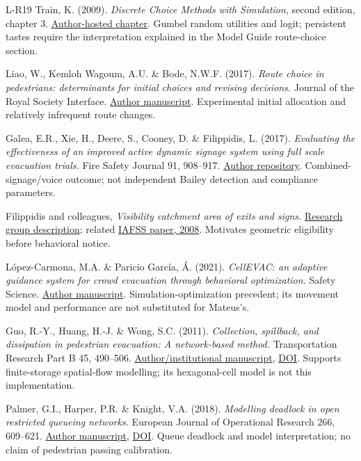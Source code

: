 \documentclass[11pt,a4paper]{article}
\begin{document}
\begin{thebibliography}{L-R19}
 Train, K. (2009). \emph{Discrete Choice Methods with Simulation}, second edition, chapter 3. \href{https://eml.berkeley.edu/books/choice2nd/Ch03_p34-75.pdf}{Author-hosted chapter}. Gumbel random utilities and logit; persistent tastes require the interpretation explained in the Model Guide route-choice section.

 Liao, W., Kemloh Wagoum, A.U. \& Bode, N.W.F. (2017). \emph{Route choice in pedestrians: determinants for initial choices and revising decisions.} Journal of the Royal Society Interface. \href{https://research-information.bris.ac.uk/files/104660277/Nikolai_Bode_Route_choice_in_pedestrians_determinants_for_initial_choices_and_revising.pdf}{Author manuscript}. Experimental initial allocation and relatively infrequent route changes.

 Galea, E.R., Xie, H., Deere, S., Cooney, D. \& Filippidis, L. (2017). \emph{Evaluating the effectiveness of an improved active dynamic signage system using full scale evacuation trials.} Fire Safety Journal 91, 908–917. \href{https://gala.gre.ac.uk/id/eprint/16552/}{Author repository}. Combined-signage/voice outcome; not independent Bailey detection and compliance parameters.

 Filippidis and colleagues, \emph{Visibility catchment area of exits and signs.} \href{https://fseg.gre.ac.uk/fire/visibility_catchment_area.html}{Research group description}; related \href{https://publications.iafss.org/publications/fss/9/389/view}{IAFSS paper, 2008}. Motivates geometric eligibility before behavioral notice.

 López-Carmona, M.A. \& Paricio García, Á. (2021). \emph{CellEVAC: an adaptive guidance system for crowd evacuation through behavioral optimization.} Safety Science. \href{https://arxiv.org/abs/2007.05963}{Author manuscript}. Simulation-optimization precedent; its movement model and performance are not substituted for Mateus's.

 Guo, R.-Y., Huang, H.-J. \& Wong, S.C. (2011). \emph{Collection, spillback, and dissipation in pedestrian evacuation: A network-based method.} Transportation Research Part B 45, 490–506. \href{https://sem.buaa.edu.cn/__local/C/C9/7C/FE43AA20309F2E9E62D9D53E007_57E48E48_2356F5.pdf}{Author/institutional manuscript}, \href{https://doi.org/10.1016/j.trb.2010.09.009}{DOI}. Supports finite-storage spatial-flow modelling; its hexagonal-cell model is not this implementation.

 Palmer, G.I., Harper, P.R. \& Knight, V.A. (2018). \emph{Modelling deadlock in open restricted queueing networks.} European Journal of Operational Research 266, 609–621. \href{https://orca.cardiff.ac.uk/id/eprint/106314/1/1-s2.0-S0377221717309529-main.pdf}{Author manuscript}, \href{https://doi.org/10.1016/j.ejor.2017.10.039}{DOI}. Queue deadlock and model interpretation; no claim of pedestrian passing calibration.
\end{thebibliography}
\end{document}
